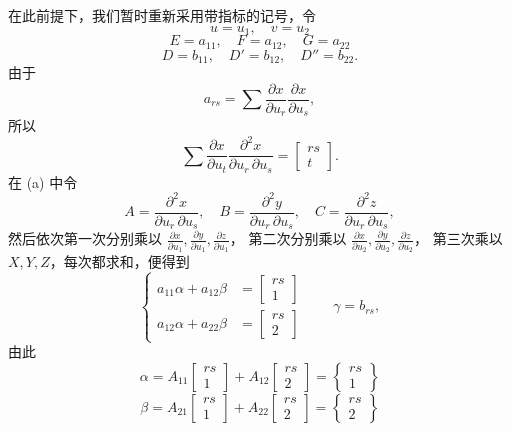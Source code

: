 在此前提下，我们暂时重新采用带指标的记号，令
\[
 u=u_1,\quad v=u_2
\]
\[
 E=a_{11},\quad F=a_{12},\quad G=a_{22}
\]
\[
 D=b_{11},\quad D'=b_{12},\quad D''=b_{22}.
\]
由于
\[
 a_{rs}=\sum\frac{\partial x}{\partial u_r}\frac{\partial x}{\partial u_s},
\]
所以
\[
 \sum\frac{\partial x}{\partial u_t}
 \frac{\partial^2x}{\partial u_r\,\partial u_s}
 =\left[\begin{matrix}rs\\ t\end{matrix}\right].
\]
在 (a) 中令
\[
 A=\frac{\partial^2x}{\partial u_r\,\partial u_s},\quad
 B=\frac{\partial^2y}{\partial u_r\,\partial u_s},\quad
 C=\frac{\partial^2z}{\partial u_r\,\partial u_s},
\]
然后依次第一次分别乘以
\(\frac{\partial x}{\partial u_1},\frac{\partial y}{\partial u_1},\frac{\partial z}{\partial u_1}\)，
第二次分别乘以
\(\frac{\partial x}{\partial u_2},\frac{\partial y}{\partial u_2},\frac{\partial z}{\partial u_2}\)，
第三次乘以 \(X,Y,Z\)，每次都求和，便得到
\[
\left\{
\begin{aligned}
 a_{11}\alpha+a_{12}\beta&=\left[\begin{matrix}rs\\1\end{matrix}\right]\\
 a_{12}\alpha+a_{22}\beta&=\left[\begin{matrix}rs\\2\end{matrix}\right]
\end{aligned}\right.
\qquad
 \gamma=b_{rs},
\]
由此
\[
 \alpha=A_{11}\left[\begin{matrix}rs\\1\end{matrix}\right]
       +A_{12}\left[\begin{matrix}rs\\2\end{matrix}\right]
       =\left\{\begin{matrix}rs\\1\end{matrix}\right\}
\]
\[
 \beta=A_{21}\left[\begin{matrix}rs\\1\end{matrix}\right]
       +A_{22}\left[\begin{matrix}rs\\2\end{matrix}\right]
       =\left\{\begin{matrix}rs\\2\end{matrix}\right\}
\]
